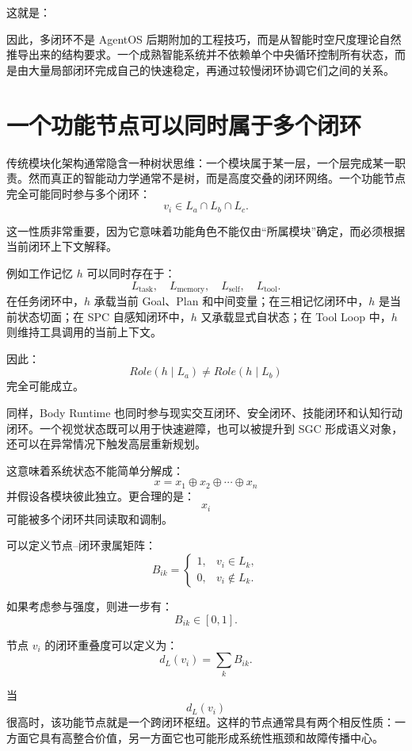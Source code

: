 这就是：
\begin{statementbox}
\centering
{}
\end{statementbox}

因此，多闭环不是 AgentOS 后期附加的工程技巧，而是从智能时空尺度理论自然推导出来的结构要求。一个成熟智能系统并不依赖单个中央循环控制所有状态，而是由大量局部闭环完成自己的快速稳定，再通过较慢闭环协调它们之间的关系。


\section{一个功能节点可以同时属于多个闭环}

传统模块化架构通常隐含一种树状思维：一个模块属于某一层，一个层完成某一职责。然而真正的智能动力学通常不是树，而是高度交叠的闭环网络。一个功能节点完全可能同时参与多个闭环：
\[
v_i
\in
L_a\cap L_b\cap L_c.
\]

这一性质非常重要，因为它意味着功能角色不能仅由“所属模块”确定，而必须根据当前闭环上下文解释。

例如工作记忆 $h$ 可以同时存在于：
\[
L_{\mathrm{task}},
\quad
L_{\mathrm{memory}},
\quad
L_{\mathrm{self}},
\quad
L_{\mathrm{tool}}.
\]
在任务闭环中，$h$ 承载当前 Goal、Plan 和中间变量；在三相记忆闭环中，$h$ 是当前状态切面；在 SPC 自感知闭环中，$h$ 又承载显式自状态；在 Tool Loop 中，$h$ 则维持工具调用的当前上下文。

因此：
\[
Role(h\mid L_a)
\neq
Role(h\mid L_b)
\]
完全可能成立。

同样，Body Runtime 也同时参与现实交互闭环、安全闭环、技能闭环和认知行动闭环。一个视觉状态既可以用于快速避障，也可以被提升到 SGC 形成语义对象，还可以在异常情况下触发高层重新规划。

这意味着系统状态不能简单分解成：
\[
x
=
x_1\oplus x_2\oplus\cdots\oplus x_n
\]
并假设各模块彼此独立。更合理的是：
\[
x_i
\]
可能被多个闭环共同读取和调制。

可以定义节点--闭环隶属矩阵：
\[
B_{ik}
=
\begin{cases}
1, & v_i\in L_k,\\
0, & v_i\notin L_k.
\end{cases}
\]

如果考虑参与强度，则进一步有：
\[
B_{ik}\in[0,1].
\]

节点 $v_i$ 的闭环重叠度可以定义为：
\[
d_L(v_i)
=
\sum_k B_{ik}.
\]

当
\[
d_L(v_i)
\]
很高时，该功能节点就是一个跨闭环枢纽。这样的节点通常具有两个相反性质：一方面它具有高整合价值，另一方面它也可能形成系统性瓶颈和故障传播中心。

